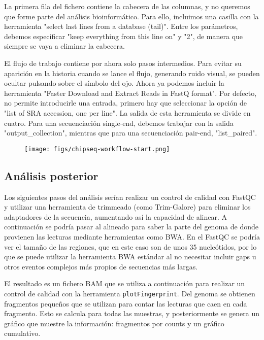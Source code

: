 La primera fila del fichero contiene la cabecera de las columnas, y no queremos que forme parte del análisis bioinformático. Para ello, incluimos una casilla con la herramienta "select last lines from a database (tail)". Entre los parámetros, debemos especificar "keep everything from this line on" y "2", de manera que siempre se vaya a eliminar la cabecera.

El flujo de trabajo contiene por ahora solo pasos intermedios. Para evitar su aparición en la historia cuando se lance el flujo, generando ruido visual, se pueden ocultar pulsando sobre el símbolo del ojo. Ahora ya podemos incluir la herramienta "Faster Download and Extract Reads in FastQ format". Por defecto, no permite introducirle una entrada, primero hay que seleccionar la opción de "list of SRA accession, one per line". La salida de esta herramienta se divide en cuatro. Para una secuenciación single-end, debemos trabajar con la salida "output\_collection", mientras que para una secuenciación pair-end, "list\_paired".

\begin{figure}[h]
\centering
\texttt{[image: figs/chipseq-workflow-start.png]}
\end{figure}

\subsection{Análisis posterior}
Los siguientes pasos del análisis serían realizar un control de calidad con FastQC y utilizar una herramienta de trimmeado (como Trim-Galore) para eliminar los adaptadores de la secuencia, aumentando así la capacidad de alinear. A continuación se podría pasar al alineado para saber la parte del genoma de donde provienen las lecturas mediante herramientas como BWA. En el FastQC se podría ver el tamaño de las regiones, que en este caso son de unos 35 nucleótidos, por lo que se puede utilizar la herramienta BWA estándar al no necesitar incluir gaps u otros eventos complejos más propios de secuencias más largas.

El resultado es un fichero BAM que se utiliza a continuación para realizar un control de calidad con la herramienta \texttt{plotFingerprint}. Del genoma se obtienen fragmentos pequeños que se utilizan para contar las lecturas que caen en cada fragmento. Esto se calcula para todas las muestras, y posteriormente se genera un gráfico que muestre la información: fragmentos por counts y un gráfico cumulativo.

